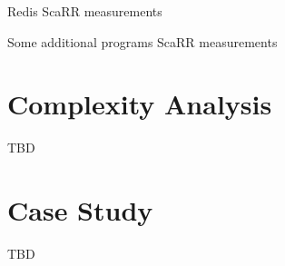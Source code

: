 \begin{table}[hbtp]
    \centering
    \caption{Redis ScaRR measurements}
\end{table}

\begin{table}[hbtp]
    \centering
    \caption{Some additional programs ScaRR measurements}
\end{table}

\section{Complexity Analysis}

TBD

\section{Case Study}

TBD